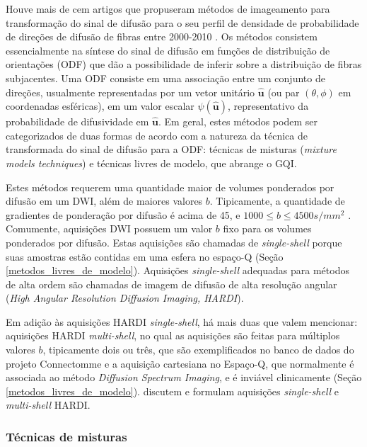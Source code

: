 \documentclass[
    12pt,                %
    oneside,            %
    a4paper,            %
    english,            %
    french,                %
    spanish,            %
    brazil                %
    ]{abntex2}
\begin{document}
Houve mais de cem artigos que propuseram métodos de imageamento para transformação do sinal de difusão para o seu perfil de densidade de probabilidade de direções de difusão de fibras entre 2000-2010 \cite{descoteaux2015}. Os métodos consistem essencialmente na síntese do sinal de difusão em funções de distribuição de orientações (ODF) que dão a possibilidade de inferir sobre a distribuição de fibras subjacentes. Uma ODF consiste em uma associação entre um conjunto de direções, usualmente representadas por um vetor unitário $\mathbf{\hat{u}}$ (ou par $(\theta, \phi)$ em coordenadas esféricas), em um valor escalar $\psi(\mathbf{\hat{u}})$, representativo da probabilidade de difusividade em $\mathbf{\hat{u}}$. Em geral, estes métodos podem ser categorizados de duas formas de acordo com a natureza da técnica de transformada do sinal de difusão para a ODF: técnicas de misturas (\textit{mixture models techniques}) e técnicas livres de modelo, que abrange o GQI.

Estes métodos requerem uma quantidade maior de volumes ponderados por difusão em um DWI, além de maiores valores $b$. Tipicamente, a quantidade de gradientes de ponderação por difusão é acima de 45, e $1000 \leq b \leq 4500s/mm^2$ \cite{descoteaux2015}. Comumente, aquisições DWI possuem um valor $b$ fixo para os volumes ponderados por difusão. Estas aquisições são chamadas de \textit{single-shell} porque suas amostras estão contidas em uma esfera no espaço-Q (Seção \ref{metodos_livres_de_modelo}). Aquisições \textit{single-shell} adequadas para métodos de alta ordem são chamadas de imagem de difusão de alta resolução angular (\textit{High Angular Resolution Diffusion Imaging, HARDI}).

Em adição às aquisições HARDI \textit{single-shell}, há mais duas que valem mencionar: aquisições HARDI \textit{multi-shell}, no qual as aquisições são feitas para múltiplos valores $b$, tipicamente dois ou três, que são exemplificados no banco de dados do projeto Connectomme \cite{essen2012} e a aquisição cartesiana no Espaço-Q, que normalmente é associada ao método \textit{Diffusion Spectrum Imaging}, e é inviável clinicamente (Seção \ref{metodos_livres_de_modelo}).  discutem e formulam aquisições \textit{single-shell} e \textit{multi-shell} HARDI.


\subsubsection{Técnicas de misturas}
\end{document}
